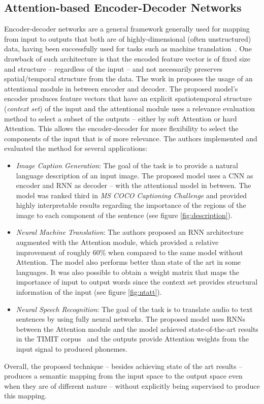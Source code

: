 \documentclass[12pt]{article}
\begin{document}
\subsection{Attention-based Encoder-Decoder Networks}
Encoder-decoder networks are a general framework generally used for mapping from input to outputs that both
are of highly-dimensional (often unstructured) data, having been successfully used for tasks such
as machine translation~\cite{ref:enc-dec-rnns}.
One drawback of such architecture is that the encoded feature vector is of fixed size and structure --
regardless of the input -- and not necessarily preserves spatial/temporal structure from the data.
The work in \cite{ref:enc-dec} proposes the usage of an attentional module in between encoder and decoder.
The proposed model's encoder produces feature vectors that have an explicit spatiotemporal structure
(\emph{context set}) of the input and the attentional module uses a relevance evaluation
method to select a subset of the outputs -- either by soft Attention or hard Attention.
This allows the encoder-decoder for more flexibility to select the components of the input that is of
more relevance.
The authors implemented and evaluated the method for several applications:
\begin{itemize}
    \item \emph{Image Caption Generation}: The goal of the task is to provide a natural language description
        of an input image.
        The proposed model uses a CNN as encoder and RNN as decoder -- with the attentional model in between.
        The model was ranked third in \emph{MS COCO Captioning Challenge} and provided highly interpretable
        results regarding the importance of the regions of the image to each component of the sentence
        (see figure \ref{fig:description}).
    \item \emph{Neural Machine Translation}: The authors proposed an RNN architecture augmented with the Attention module, which provided a relative improvement of roughly 60\% when compared to the same model without Attention.
        The model also performs better than state of the art in some languages.
        It was also possible to obtain a weight matrix that maps the importance of input to output words since the context set provides structural information of the input (see figure \ref{fig:ntatt}).
    \item \emph{Neural Speech Recognition}: The goal of the task is to translate audio to text sentences by
        using fully neural networks.
        The proposed model uses RNNs between the Attention module and the model achieved state-of-the-art results in the TIMIT corpus~\cite{ref:timit} and the outputs provide Attention weights from
        the input signal to produced phonemes.
\end{itemize}
Overall, the proposed technique -- besides achieving state of the art results --
produces a semantic mapping from the input space to the output space even when they are of different nature
-- without explicitly being supervised to produce this mapping.
\end{document}
